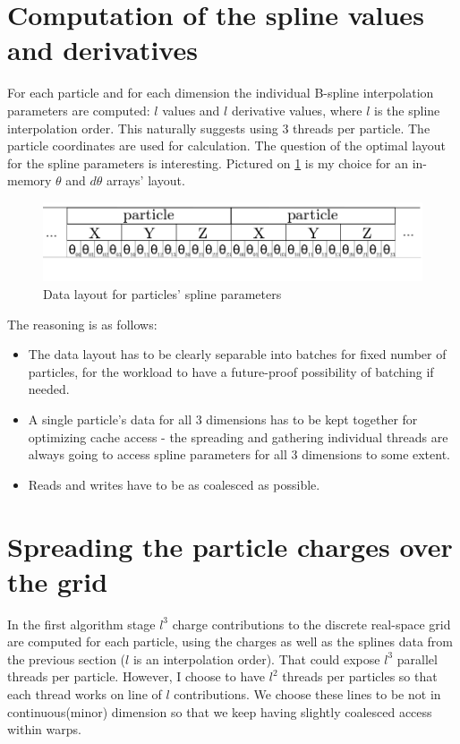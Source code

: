 \documentclass[12pt,a4paper]{report}
\newcommand{\draft}[1]{#1}
\begin{document}
\section{Computation of the spline values and derivatives}
For each particle and for each dimension the individual B-spline interpolation parameters are computed: $l$ values and $l$ derivative values, where $l$ is the spline interpolation order. This naturally suggests using 3 threads per particle. The particle coordinates are used for calculation.
The question of the optimal layout for the spline parameters is interesting. Pictured on \ref{fig:spline} is my choice for an in-memory $\theta$ and $d\theta$ arrays' layout. 
\FloatBarrier
\begin{figure}[h!]
    \centering
    \includegraphics[width=1\textwidth]{pics/theta.png}
    \caption{Data layout for particles' spline parameters}
    \label{fig:spline}
\end{figure}
\FloatBarrier
The reasoning is as follows:
\begin{itemize}
\item The data layout has to be clearly separable into batches for fixed number of particles, for the workload to have a future-proof possibility of batching if needed.
\item A single particle's data for all 3 dimensions has to be kept together for optimizing cache access - the spreading and gathering individual threads are always going to access spline parameters for all 3 dimensions to some extent. 
\item Reads and writes have to be as coalesced as possible.
\end{itemize}

\section{Spreading the particle charges over the grid}
In the first algorithm stage $l^3$ charge contributions to the discrete real-space grid are computed for each particle, using the charges as well as the splines data from the previous section ($l$ is an \draft{interpolation order}).
That could expose $l^3$ parallel threads per particle. However, I choose to have $l^2$ threads per particles so that each thread works on line of $l$ contributions. We choose these lines to be not in continuous(minor) dimension so that we keep having slightly coalesced access within warps. 
\end{document}
